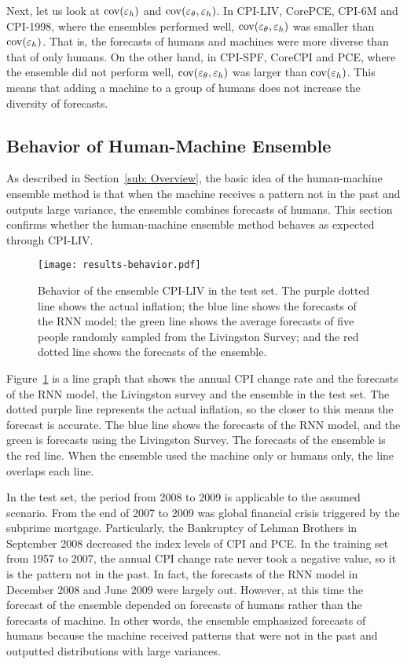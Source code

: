 \documentclass[../main.tex]{subfiles}
\begin{document}
Next, let us look at $\operatorname{cov}(\varepsilon_h)$ and $\operatorname{cov}(\varepsilon_\theta, \varepsilon_h)$.
In CPI-LIV, CorePCE, CPI-6M and CPI-1998, where the ensembles performed well, $\operatorname{cov}(\varepsilon_\theta, \varepsilon_h)$ was smaller than $\operatorname{cov}(\varepsilon_h)$.
That is, the forecasts of humans and machines were more diverse than that of only humans.
On the other hand, in CPI-SPF, CoreCPI and PCE, where the ensemble did not perform well, $\operatorname{cov}(\varepsilon_\theta, \varepsilon_h)$ was larger than $\operatorname{cov}(\varepsilon_h)$.
This means that adding a machine to a group of humans does not increase the diversity of forecasts.

\subsection{Behavior of Human-Machine Ensemble}
\label{sub: Behavior of Human-Machine Ensemble}

As described in Section~\ref{sub: Overview}, the basic idea of the human-machine ensemble method is that when the machine receives a pattern not in the past and outputs large variance, the ensemble combines forecasts of humans.
This section confirms whether the human-machine ensemble method behaves as expected through CPI-LIV\@.

\begin{figure}
  \centering
  \texttt{[image: results-behavior.pdf]}
  \caption{
    Behavior of the ensemble CPI-LIV in the test set.
    The purple dotted line shows the actual inflation; the blue line shows the forecasts of the RNN model; the green line shows the average forecasts of five people randomly sampled from the Livingston Survey; and the red dotted line shows the forecasts of the ensemble.
  }\label{fig: behavior}
\end{figure}

Figure~\ref{fig: behavior} is a line graph that shows the annual CPI change rate and the forecasts of the RNN model, the Livingston survey and the ensemble in the test set.
The dotted purple line represents the actual inflation, so the closer to this means the forecast is accurate.
The blue line shows the forecasts of the RNN model, and the green is forecasts using the Livingston Survey.
The forecasts of the ensemble is the red line.
When the ensemble used the machine only or humans only, the line overlaps each line.

In the test set, the period from 2008 to 2009 is applicable to the assumed scenario.
From the end of 2007 to 2009 was global financial crisis triggered by the subprime mortgage.
Particularly, the Bankruptcy of Lehman Brothers in September 2008 decreased the index levels of CPI and PCE\@.
In the training set from 1957 to 2007, the annual CPI change rate never took a negative value, so it is the pattern not in the past.
In fact, the forecasts of the RNN model in December 2008 and June 2009 were largely out.
However, at this time the forecast of the ensemble depended on forecasts of humans rather than the forecasts of machine.
In other words, the ensemble emphasized forecasts of humans because the machine received patterns that were not in the past and outputted distributions with large variances.
\end{document}
